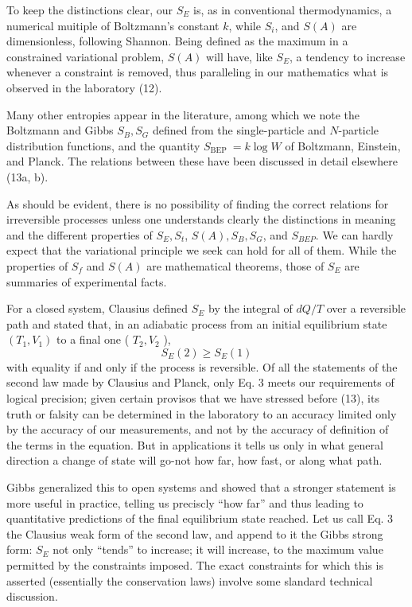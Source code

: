 \documentclass{article}
\begin{document}
To keep the distinctions clear, our $S_E$ is, as in conventional thermodynamics, a numerical muitiple of Boltzmann's constant $k$, while $S_i$, and $S(A)$ are dimensionless, following Shannon. Being defined as the maximum in a constrained variational problem, $S(A)$ will have, like $S_E$, a tendency to increase whenever a constraint is removed, thus paralleling in our mathematics what is observed in the laboratory (12).

Many other entropies appear in the literature, among which we note the Boltzmann and Gibbs $S_B, S_G$ defined from the single-particle and $N$-particle distribution functions, and the quantity $S_{\text {BEP }}=k \log W$ of Boltzmann, Einstein, and Planck. The relations between these have been discussed in detail elsewhere (13a, b).

As should be evident, there is no possibility of finding the correct relations for irreversible processes unless one understands clearly the distinctions in meaning and the different properties of $S_E, S_t$, $S(A), S_B, S_G$, and $S_{B E P}$. We can hardly expect that the variational principle we seek can hold for all of them. While the properties of $S_f$ and $S(A)$ are mathematical theorems, those of $S_E$ are summaries of experimental facts.

For a closed system, Clausius defined $S_E$ by the integral of $d Q / T$ over a reversible path and stated that, in an adiabatic process from an initial equilibrium state $\left(T_1, V_1\right)$ to a final one ( $T_2, V_2$ ),
$$
S_E(2) \geqslant S_E(1)
$$
with equality if and only if the process is reversible. Of all the statements of the second law made by Clausius and Planck, only Eq. 3 meets our requirements of logical precision; given certain provisos that we have stressed before (13), its truth or falsity can be determined in the laboratory to an accuracy limited only by the accuracy of our measurements, and not by the accuracy of definition of the terms in the equation. But in applications it tells us only in what general direction a change of state will go-not how far, how fast, or along what path.

Gibbs \cite{gibbs1876} generalized this to open systems and showed that a stronger statement is more useful in practice, telling us preciscly ``how far'' and thus leading to quantitative predictions of the final equilibrium state reached. Let us call Eq. 3 the Clausius weak form of the second law, and append to it the Gibbs strong form: $S_E$ not only ``tends'' to increase; it will increase, to the maximum value permitted by the constraints imposed. The exact constraints for which this is asserted (essentially the conservation laws) involve some slandard technical discussion.
\end{document}
